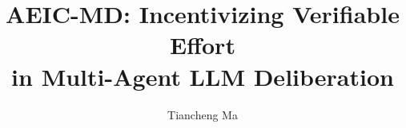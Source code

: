 \documentclass[runningheads]{llncs}
\begin{document}
\title{AEIC-MD: Incentivizing Verifiable Effort\\in Multi-Agent LLM Deliberation}


\author{Tiancheng Ma}


\maketitle














\end{document}

